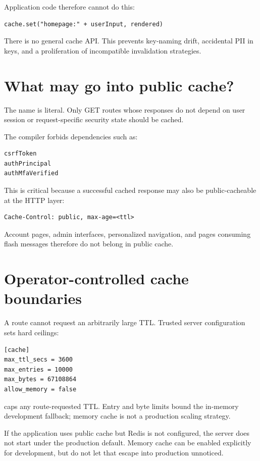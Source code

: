 Application code therefore cannot do this:

\begin{lstlisting}
cache.set("homepage:" + userInput, rendered)
\end{lstlisting}

There is no general cache API. This prevents key-naming drift, accidental PII in keys, and a proliferation of incompatible invalidation strategies.

\section{What may go into public cache?}

The name  is literal. Only GET routes whose responses do not depend on user session or request-specific security state should be cached.

The compiler forbids dependencies such as:

\begin{lstlisting}
csrfToken
authPrincipal
authMfaVerified
\end{lstlisting}

This is critical because a successful cached response may also be public-cacheable at the HTTP layer:

\begin{lstlisting}
Cache-Control: public, max-age=<ttl>
\end{lstlisting}

Account pages, admin interfaces, personalized navigation, and pages consuming flash messages therefore do not belong in public cache.

\section{Operator-controlled cache boundaries}

A route cannot request an arbitrarily large TTL. Trusted server configuration sets hard ceilings:

\begin{lstlisting}
[cache]
max_ttl_secs = 3600
max_entries = 10000
max_bytes = 67108864
allow_memory = false
\end{lstlisting}

 caps any route-requested TTL. Entry and byte limits bound the in-memory development fallback; memory cache is not a production scaling strategy.

If the application uses public cache but Redis is not configured, the server does not start under the production default. Memory cache can be enabled explicitly for development, but do not let that escape into production unnoticed.

